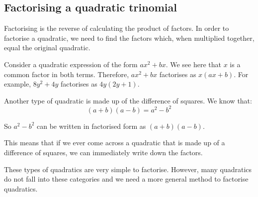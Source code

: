 \subsection* {Factorising a quadratic trinomial }

Factorising is the reverse of calculating the product of factors. In order to factorise a quadratic, we need to find the factors which, when multiplied together, equal the original quadratic.\par 

Consider a quadratic expression of the form $a{x}^{2}+bx$. We see here
that $x$ is a common factor in both terms. Therefore, $a{x}^{2}+bx$
factorises as $x(ax+b)$. For example, $8{y}^{2}+4y$ factorises as
$4y(2y+1)$.

Another type of quadratic is made up of the difference of squares. We
know that:
\begin{equation*}
  (a+b)(a-b)={a}^{2}-{b}^{2}
\end{equation*}

So $a^2-b^2$ can be written in factorised form as $(a+b)(a-b)$.
\par
This means that if we ever come across a quadratic that is made up of a difference of squares, we can immediately write down the factors. 


These types of quadratics are very simple to factorise. However, many quadratics do not fall into these categories and we need a more general method to factorise quadratics.

